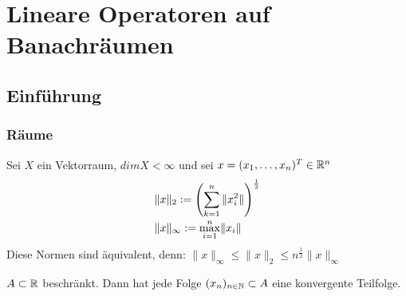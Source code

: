
\chapter{Lineare Operatoren auf Banachr{\"a}umen}
\section{Einf{\"u}hrung}
\subsection{R{\"a}ume}

Sei $X$ ein Vektorraum, $dim X < \infty $ und sei $x = (x_{1},\dotsc,x_{n})^{T} \in \mathbb{R}^{n}$
\begin{align*}
	& \|x\|_{2} := \left(\sum_{k = 1}^{n} \|x_{i}^{2}\| \right)^{\frac{1}{2}}\\
	& \|x\|_{\infty} := \smash{\displaystyle\max_{i = 1}^{n}}  \|x_{i}\|		
\end{align*}	

Diese Normen sind äquivalent, denn:
$\| x \|_{\infty} \leq \| x \|_{2} \leq n^{\frac{1}{2}} \| x \|_{\infty}$ \newline

\begin{satz*}  \label{s:1-bolzanoweierstrass}
$A \subset \mathbb{R}$ beschränkt. Dann hat jede Folge $(x_{n})_{n \in \mathbb{N}} \subset A$ eine konvergente Teilfolge.
\end{satz*}

